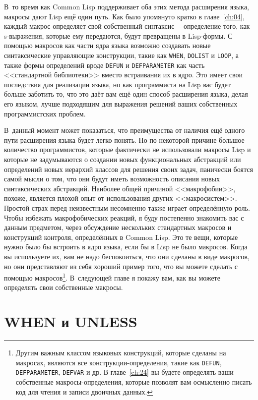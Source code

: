 В~то время как Common Lisp поддерживает оба этих метода расширения языка, макросы дают
Lisp ещё один путь.  Как было упомянуто кратко в главе~\ref{ch:04}, каждый макрос определяет свой
собственный синтаксис~-- определение того, как s-выражения, которые ему передаются, будут
превращены в Lisp-формы. С помощью макросов как части ядра языка возможно создавать
новые синтаксические управляющие конструкции, такие как \lstinline{WHEN}, \lstinline{DOLIST} и
\lstinline{LOOP}, а также формы определений вроде \lstinline{DEFUN} и \lstinline{DEFPARAMETER} как
часть <<стандартной библиотеки>> вместо встраивания их в ядро. Это имеет свои последствия
для реализации языка, но как программиста на Lisp вас будет больше заботить то, что это
даёт вам ещё один способ расширения языка, делая его языком, лучше подходящим для
выражения решений ваших собственных программистских проб\-лем.

В~данный момент может показаться, что преимущества от наличия ещё одного пути расширения
языка будет легко понять. Но по некоторой причине большое количество программистов,
которые фактически не использовали макросы Lisp и которые не задумываются о создании новых
функциональных абстракций или определений новых иерархий классов для решения своих задач,
панически боятся самой мысли о том, что они будут иметь возможность описания новых
синтаксических абстракций. Наиболее общей причиной <<макрофобии>>, похоже, является плохой
опыт от использования других <<макросистем>>. Простой страх перед неизвестным несомненно
также играет определённую роль. Чтобы избежать макрофобических реакций, я буду постепенно
знакомить вас с данным предметом, через обсуждение нескольких стандартных макросов и
конструкций контроля, определённых в Common Lisp. Это те вещи, которые нужно было бы
встроить в ядро языка, если бы в Lisp не было макросов. Когда вы используете их, вам не
надо беспокоиться, что они сделаны в виде макросов, но они представляют из себя хороший
пример того, что вы можете сделать с помощью макросов\footnote{Другим важным классом
  языковых конструкций, которые сделаны на макросах, являются все конструкции-определения,
  такие как \lstinline{DEFUN}, \lstinline{DEFPARAMETER}, \lstinline{DEFVAR} и др. В
  главе~\ref{ch:24} вы будете определять ваши собственные макросы-определения, которые
  позволят вам осмысленно писать код для чтения и записи двоичных данных.}\hspace{\footnotenegspace}. В~следующей
главе я покажу вам, как вы можете определять свои собственные макросы.

\section{WHEN и UNLESS}

